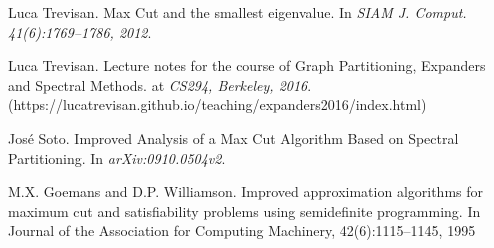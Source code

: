   
\begin{thebibliography}{1}
Luca Trevisan.
\newblock Max Cut and the smallest eigenvalue.
\newblock In {\em SIAM J. Comput. 41(6):1769–1786, 2012}.

Luca Trevisan.
\newblock Lecture notes for the course of Graph Partitioning, Expanders and Spectral Methods.
\newblock at {\em CS294, Berkeley, 2016}.
(https://lucatrevisan.github.io/teaching/expanders2016/index.html)


José Soto.
\newblock Improved Analysis of a Max Cut Algorithm Based on Spectral Partitioning.
\newblock In {\em arXiv:0910.0504v2}.

M.X. Goemans and D.P. Williamson.
\newblock Improved approximation algorithms for maximum cut and satisfiability problems using semidefinite programming.
\newblock In Journal of the Association for Computing Machinery, 42(6):1115–1145, 1995

\end{thebibliography}